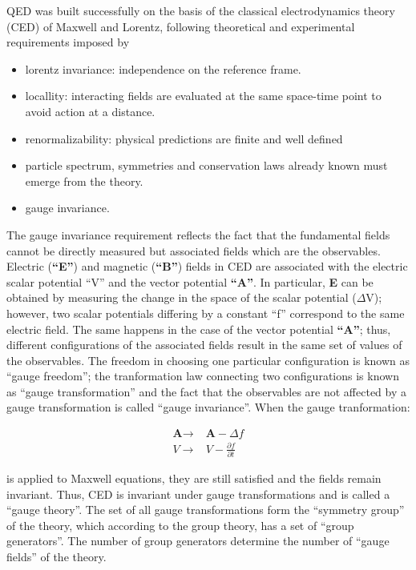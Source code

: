 \noindent QED was built successfully on the basis of the classical electrodynamics theory (CED) of Maxwell and Lorentz, following theoretical and experimental requirements imposed by

\begin{itemize}
\item lorentz invariance: independence on the reference frame.  
\item locallity: interacting fields are evaluated at the same space-time point to avoid action at a distance. 
\item renormalizability: physical predictions are finite and well defined 
\item particle spectrum, symmetries and conservation laws already known must emerge from the theory.
\item gauge invariance.
\end{itemize}

\noindent The gauge invariance requirement reflects the fact that the fundamental fields cannot be directly measured but associated fields which are the observables. Electric (\textbf{``E''}) and magnetic (\textbf{``B''}) fields in CED are associated with the electric scalar potential ``V'' and the vector potential \textbf{``A''}. In particular, \textbf{E} can be obtained by measuring the change in the space of the scalar potential (\textbf{$\Delta$}V); however, two scalar potentials differing by a constant ``f'' correspond to the same electric field. The same happens in the case of the vector potential \textbf{``A''}; thus, different configurations of the associated fields result in the same set of values of the observables. The freedom in choosing one particular configuration is known as ``gauge freedom''; the tranformation law connecting two configurations is known as ``gauge transformation'' and the fact that the observables are not affected by a gauge transformation is called ``gauge invariance''.
\noindent When the gauge tranformation:  

\begin{align}\label{cov_der}
\textbf{A} \to &\textbf{A} -\Delta f\nonumber\\
V \to & V - \frac{\partial f}{\partial t}
\end{align}

\noindent is applied to Maxwell equations, they are still satisfied and the fields remain invariant. Thus, CED is invariant under gauge transformations and is called a ``gauge theory''. The set of all gauge transformations form the ``symmetry group'' of the theory, which according to the group theory, has a set of ``group generators''. The number of group generators determine the number of ``gauge fields'' of the theory.\\

